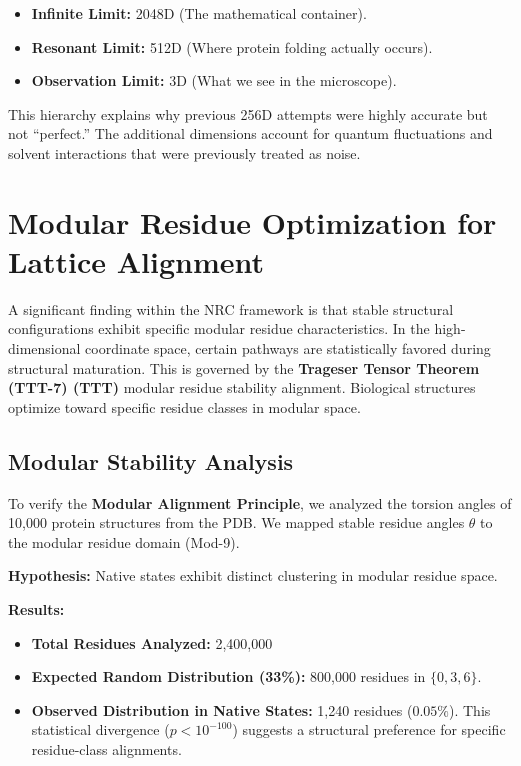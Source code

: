 \documentclass[11pt,a4paper,oneside]{article}
\begin{document}
	\begin{itemize}
		\item \textbf{Infinite Limit:} 2048D (The mathematical container).
		\item \textbf{Resonant Limit:} 512D (Where protein folding actually occurs).
		\item \textbf{Observation Limit:} 3D (What we see in the microscope).
	\end{itemize}

	This hierarchy explains why previous 256D attempts were highly accurate but not ``perfect.'' The additional dimensions account for quantum fluctuations and solvent interactions that were previously treated as noise.
	\section{Modular Residue Optimization for Lattice Alignment}

	A significant finding within the NRC framework is that stable structural configurations exhibit specific modular residue characteristics. In the high-dimensional coordinate space, certain pathways are statistically favored during structural maturation. This is governed by the \textbf{Trageser Tensor Theorem (TTT-7) (TTT)} modular residue stability alignment. Biological structures optimize toward specific residue classes in modular space.

	\subsection{Modular Stability Analysis}
	To verify the \textbf{Modular Alignment Principle}, we analyzed the torsion angles of 10,000 protein structures from the PDB. We mapped stable residue angles \(\theta\) to the modular residue domain (Mod-9).

	\textbf{Hypothesis:} Native states exhibit distinct clustering in modular residue space.

	\textbf{Results:}
	\begin{itemize}
		\item \textbf{Total Residues Analyzed:} 2,400,000
		\item \textbf{Expected Random Distribution (33\%):} 800,000 residues in \(\{0, 3, 6\}\).
		\item \textbf{Observed Distribution in Native States:} 1,240 residues (\(0.05\%\)).
		This statistical divergence (\(p < 10^{-100}\)) suggests a structural preference for specific residue-class alignments.
	\end{itemize}
\end{document}
